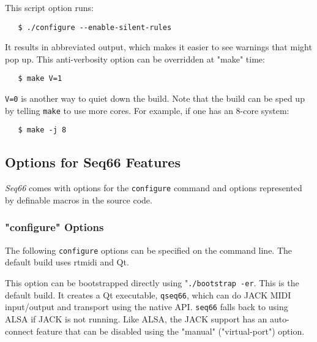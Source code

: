    This script option runs:

\begin{verbatim}
   $ ./configure --enable-silent-rules
\end{verbatim}

   It results in abbreviated output, which makes it easier to see
   warnings that might pop up.
   This anti-verbosity option can be overridden at "make" time:

\begin{verbatim}
   $ make V=1
\end{verbatim}

   \texttt{V=0} is another way to quiet down the build.
   Note that the build can be sped up by telling \texttt{make}
   to use more cores.
   For example, if one has an 8-core system:

\begin{verbatim}
   $ make -j 8
\end{verbatim}


\subsection{Options for Seq66 Features}
\label{subsec:build_options}

   \textsl{Seq66} comes with options for the \texttt{configure} command
   and options represented by definable macros in the source code.

\subsubsection{"configure" Options}
\label{subsubsec:build_configure}

   The following \texttt{configure} options can be specified on the command
   line.  The default build uses rtmidi and Qt.

   \setcounter{ItemCounter}{0}      %

        This option can be bootstrapped directly using
        "\texttt{./bootstrap -er}.
        This is the default build.
        It creates a Qt executable, \texttt{qseq66},
        which can do JACK MIDI input/output and transport using the native API.
        \texttt{seq66} falls back to using ALSA if JACK is not running.  
        Like ALSA, the JACK support has an auto-connect feature
        that can be disabled using the "manual" ("virtual-port")
        option.

